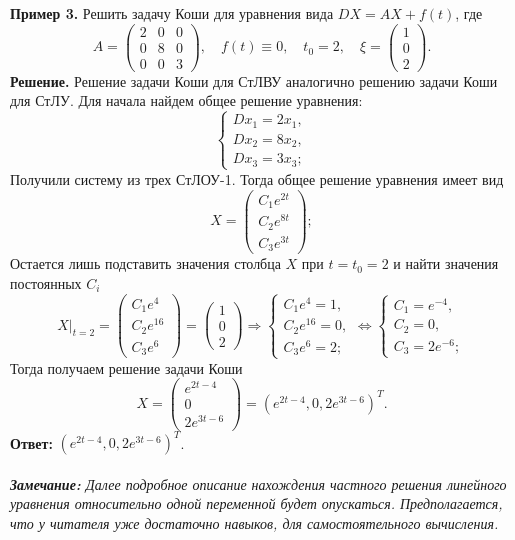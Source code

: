 \documentclass[a4paper, 12pt]{article}
\begin{document}
\textbf{Пример 3.} Решить задачу Коши для уравнения вида $DX = AX + f(t)$, где $$A = \begin{pmatrix}
	2 & 0 & 0\\
	0 & 8 & 0\\
	0 & 0 & 3
\end{pmatrix},\quad f(t)\equiv0,\quad t_0 = 2,\quad \xi =\begin{pmatrix}
1\\0\\2
\end{pmatrix}.$$
\textbf{Решение.} Решение задачи Коши для СтЛВУ аналогично решению задачи Коши для СтЛУ. Для начала найдем общее решение уравнения:
$$\begin{cases}
	Dx_1 = 2x_1,\\
	Dx_2 = 8x_2,\\
	Dx_3 = 3x_3;
\end{cases}$$
Получили систему из трех СтЛОУ-1. Тогда общее решение уравнения имеет вид
$$X = \begin{pmatrix}
	C_1e^{2t}\\
	C_2e^{8t}\\
	C_3e^{3t}
\end{pmatrix};$$
Остается лишь подставить значения столбца $X$ при $t = t_0 = 2$ и найти значения постоянных $C_i$
$$X|_{t=2} = \begin{pmatrix}
	C_1e^{4}\\
	C_2e^{16}\\
	C_3e^{6}
\end{pmatrix} = \begin{pmatrix}
1\\
0\\
2
\end{pmatrix}\Rightarrow\begin{cases}
C_1e^{4} = 1,\\
C_2e^{16} = 0,\\
C_3e^{6} = 2;
\end{cases}\Longleftrightarrow\begin{cases}
C_1 = e^{-4},\\
C_2 = 0,\\
C_3 = 2e^{-6};
\end{cases}$$
Тогда получаем решение задачи Коши
$$X = \begin{pmatrix}
	e^{2t-4}\\
	0\\
	2e^{3t-6}
\end{pmatrix} = (e^{2t-4}, 0, 2e^{3t-6})^T.$$
\textbf{Ответ:} $(e^{2t-4}, 0, 2e^{3t-6})^T$.\\\\
\textit{\textbf{Замечание:} Далее подробное описание нахождения частного решения линейного уравнения относительно одной переменной будет опускаться. Предполагается, что у читателя уже достаточно навыков, для самостоятельного вычисления.}
\end{document}
